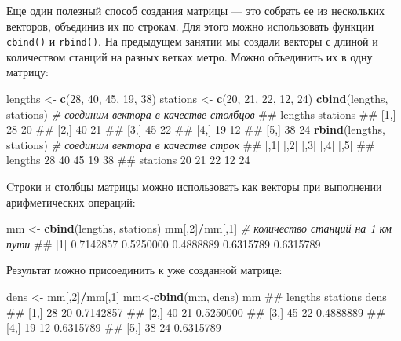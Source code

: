 \documentclass[]{book}
\newenvironment{Shaded}{\begin{snugshade}}{\end{snugshade}}
\newcommand{\KeywordTok}[1]{\textcolor[rgb]{0.13,0.29,0.53}{\textbf{#1}}}
\newcommand{\DecValTok}[1]{\textcolor[rgb]{0.00,0.00,0.81}{#1}}
\newcommand{\StringTok}[1]{\textcolor[rgb]{0.31,0.60,0.02}{#1}}
\newcommand{\CommentTok}[1]{\textcolor[rgb]{0.56,0.35,0.01}{\textit{#1}}}
\newcommand{\OperatorTok}[1]{\textcolor[rgb]{0.81,0.36,0.00}{\textbf{#1}}}
\newcommand{\NormalTok}[1]{#1}
\begin{document}
Еще один полезный способ создания матрицы --- это собрать ее из
нескольких векторов, объединив их по строкам. Для этого можно
использовать функции \texttt{cbind()} и \texttt{rbind()}. На предыдущем
занятии мы создали векторы с длиной и количеством станций на разных
ветках метро. Можно объединить их в одну матрицу:

\begin{Shaded}
\begin{Highlighting}[]
\NormalTok{lengths <-}\StringTok{ }\KeywordTok{c}\NormalTok{(}\DecValTok{28}\NormalTok{, }\DecValTok{40}\NormalTok{, }\DecValTok{45}\NormalTok{, }\DecValTok{19}\NormalTok{, }\DecValTok{38}\NormalTok{)}
\NormalTok{stations <-}\StringTok{ }\KeywordTok{c}\NormalTok{(}\DecValTok{20}\NormalTok{, }\DecValTok{21}\NormalTok{, }\DecValTok{22}\NormalTok{, }\DecValTok{12}\NormalTok{, }\DecValTok{24}\NormalTok{)}
\KeywordTok{cbind}\NormalTok{(lengths, stations)  }\CommentTok{# соединим вектора в качестве столбцов}
\NormalTok{##      lengths stations}
\NormalTok{## [1,]      28       20}
\NormalTok{## [2,]      40       21}
\NormalTok{## [3,]      45       22}
\NormalTok{## [4,]      19       12}
\NormalTok{## [5,]      38       24}
\KeywordTok{rbind}\NormalTok{(lengths, stations)  }\CommentTok{# соединим вектора в качестве строк}
\NormalTok{##          [,1] [,2] [,3] [,4] [,5]}
\NormalTok{## lengths    28   40   45   19   38}
\NormalTok{## stations   20   21   22   12   24}
\end{Highlighting}
\end{Shaded}

Cтроки и столбцы матрицы можно использовать как векторы при выполнении
арифметических операций:

\begin{Shaded}
\begin{Highlighting}[]
\NormalTok{mm <-}\StringTok{ }\KeywordTok{cbind}\NormalTok{(lengths, stations)}
\NormalTok{mm[,}\DecValTok{2}\NormalTok{]}\OperatorTok{/}\NormalTok{mm[,}\DecValTok{1}\NormalTok{]  }\CommentTok{# количество станций на 1 км пути}
\NormalTok{## [1] 0.7142857 0.5250000 0.4888889 0.6315789 0.6315789}
\end{Highlighting}
\end{Shaded}

Результат можно присоединить к уже созданной матрице:

\begin{Shaded}
\begin{Highlighting}[]
\NormalTok{dens <-}\StringTok{ }\NormalTok{mm[,}\DecValTok{2}\NormalTok{]}\OperatorTok{/}\NormalTok{mm[,}\DecValTok{1}\NormalTok{]}
\NormalTok{mm<-}\KeywordTok{cbind}\NormalTok{(mm, dens)}
\NormalTok{mm}
\NormalTok{##      lengths stations      dens}
\NormalTok{## [1,]      28       20 0.7142857}
\NormalTok{## [2,]      40       21 0.5250000}
\NormalTok{## [3,]      45       22 0.4888889}
\NormalTok{## [4,]      19       12 0.6315789}
\NormalTok{## [5,]      38       24 0.6315789}
\end{Highlighting}
\end{Shaded}
\end{document}
